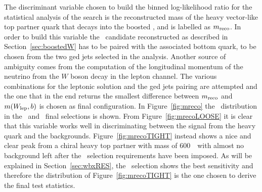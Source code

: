The discriminant variable chosen to build the binned log-likelihood ratio
for the statistical analysis of the search is the reconstructed mass of the
heavy vector-like top partner quark that decays into the boosted \whad, 
and is labelled as $m_{\rm reco}$. In order to build this variable the \whad\ 
candidate reconstructed as described in Section~\ref{sec:boostedW} has to
be paired with the associated bottom quark, to be chosen from the two
\btag ged jets selected in the analysis.
Another source of ambiguity comes from the computation of the longitudinal
momentum of the neutrino from the $W$ boson decay in the lepton channel.
The various combinations for the leptonic solution and the \btag ged jets
pairing are attempted and the one that in the end returns
the smallest difference between $m_{\rm reco}$ and $m(\wlep,b)$ is chosen
as final configuration.
In Figure~\ref{fig:mreco} the \mreco\ distribution in the \loose\
and \tight\ final selections is shown. From Figure~\ref{fig:mrecoLOOSE}
it is clear that this variable works well in discriminating between the
signal from the heavy quark and the backgrounds. Figure~\ref{fig:mrecoTIGHT}
instead shows a nice and clear peak from a chiral heavy top partner with mass
of 600~\gev\ with almost no background left after the \tight\ selection
requirements have been imposed.
As will be explained in Section~\ref{sec:wbxRES}, the \tight\ selection
shows the best sensitivity and therefore the distribution of 
Figure~\ref{fig:mrecoTIGHT} is the one chosen to derive the final test
statistics.

